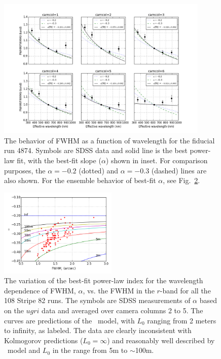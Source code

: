 \begin{figure}[th]
\centering
\includegraphics[width=0.9\textwidth]{FIGURES/fwhm_lambda.png}
\caption{The behavior of FWHM as a function of wavelength for the fiducial run 4874.
Symbols are SDSS data and solid line is the best power-law fit, with the best-fit slope
($\alpha$) shown in inset. For comparison purposes, the $\alpha=-0.2$ (dotted) and $\alpha=-0.3$ 
(dashed) lines are also shown. For the ensemble behavior of best-fit $\alpha$, see Fig.~\ref{fig:alpha_fwhm}. 
\label{fig:fwhm_lambda}}
\end{figure}


\begin{figure}[th]
\centering
\includegraphics[width=0.5\textwidth]{FIGURES/alpha_fwhm.png}
\caption{The variation of the best-fit power-law index for the wavelength dependence of FWHM, $\alpha$, 
vs. the FWHM in the $r$-band for all the 108 Stripe 82 runs. The symbols are SDSS
measurements of $\alpha$ based on the $ugri$ data and averaged over camera columns 2 to 5. 
The curves are predictions of the 
\vk~model, with $L_0$ ranging from 2 meters to infinity, as labeled. The data are clearly
inconsistent with Kolmogorov predictions ($L_0=\infty$) and reasonably well described by
\vk~model and $L_0$ in the range from 5m to $\sim$100m.  \label{fig:alpha_fwhm}}
\end{figure}


